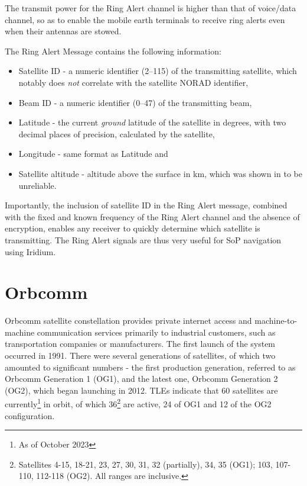 The transmit power for the Ring Alert channel is higher than that of voice/data channel, so as to enable the mobile earth terminals to receive ring alerts even when their antennas are stowed\cite{sat09}.

The Ring Alert Message contains the following information\cite{sat08}:
\begin{itemize}
    \item Satellite ID - a numeric identifier (\numrange{2}{115}) of the transmitting satellite, which notably does \emph{not} correlate with the satellite NORAD identifier,
    \item Beam ID - a numeric identifier (\numrange{0}{47}) of the transmitting beam,
    \item Latitude - the current \emph{ground} latitude of the satellite in degrees, with two decimal places of precision, calculated by the satellite,
    \item Longitude - same format as Latitude and
    \item Satellite altitude - altitude above the surface in \unit{\km}, which was shown in \cite{sat08} to be unreliable.
\end{itemize}

Importantly, the inclusion of satellite ID in the Ring Alert message, combined with the fixed and known frequency of the Ring Alert channel and the absence of encryption, enables any receiver to quickly determine which satellite is transmitting. The Ring Alert signals are thus very useful for SoP navigation using Iridium.


\section{Orbcomm}
Orbcomm satellite constellation provides private internet access and machine-to-machine communication services primarily to industrial customers, such as transportation companies or manufacturers. The first launch of the system occurred in 1991. There were several generations of satellites, of which two amounted to significant numbers - the first production generation, referred to as Orbcomm Generation 1 (OG1), and the latest one, Orbcomm Generation 2 (OG2), which began launching in 2012. TLEs indicate that 60 satellites are currently\footnote{As of October 2023} in orbit, of which 36\footnote{Satellites 4-15, 18-21, 23, 27, 30, 31, 32 (partially), 34, 35 (OG1); 103, 107-110, 112-118 (OG2). All ranges are inclusive.} are active, 24 of OG1 and 12 of the OG2 configuration\cite{sat12}.

